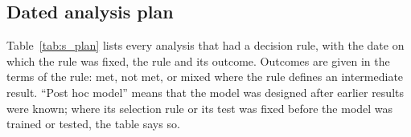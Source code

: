 \subsection{Dated analysis plan}

Table~\ref{tab:s_plan} lists every analysis that had a decision rule, with the date on which the rule was fixed, the rule and its outcome. Outcomes are given in the terms of the rule: met, not met, or mixed where the rule defines an intermediate result. ``Post hoc model'' means that the model was designed after earlier results were known; where its selection rule or its test was fixed before the model was trained or tested, the table says so.

\newcommand{\planhead}{\toprule
\textbf{Analysis: what was asked} & \textbf{Rule fixed} & \textbf{Status} & \textbf{Decision rule} & \textbf{Outcome} \\
\midrule}
\newenvironment{plantab}{\tabular{@{}L{0.205\textwidth}L{0.12\textwidth}L{0.105\textwidth}L{0.285\textwidth}L{0.215\textwidth}@{}}}{\endtabular}

